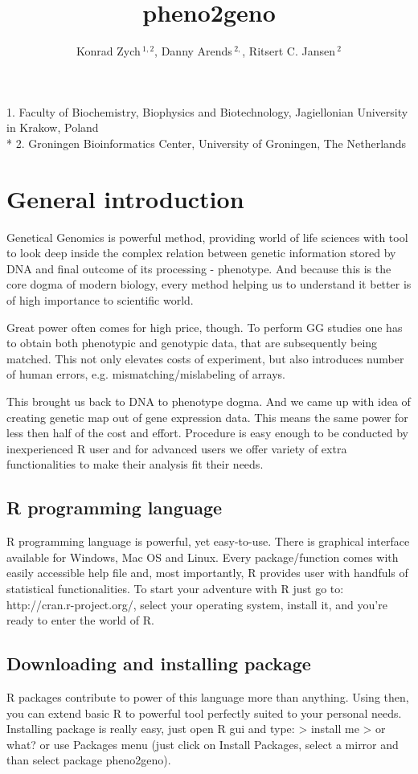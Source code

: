 \documentclass{article}
\begin{document}
\title {pheno2geno}
\author{
Konrad Zych\,$^{1,2}$, 
Danny Arends\,$^{2,}$,
 Ritsert C. Jansen\,$^{2}$
}
\maketitle
{\noindent}1. Faculty of Biochemistry, Biophysics and Biotechnology, Jagiellonian University in Krakow, Poland \\*
2. Groningen Bioinformatics Center, University of Groningen, The Netherlands

\newpage

\section{General introduction}
\begin{multicols}{2}
{\noindent}Genetical Genomics \citep{Jansen:2001388} is powerful method, providing world of life sciences with tool to look deep inside the complex relation between genetic information stored by DNA and final outcome of its processing - phenotype. And because this is the core dogma of modern biology, every method helping us to understand it better is of high importance to scientific world. 

{\noindent}Great power often comes for high price, though. To perform GG studies one has to obtain both phenotypic and genotypic data, that are subsequently being matched. This not only elevates costs of experiment, but also introduces number of human errors, e.g. mismatching/mislabeling of arrays.

{\noindent}This brought us back to DNA to phenotype dogma. And we came up with idea of creating genetic map out of gene expression data. This means the same power for less then half of the cost and effort. Procedure is easy enough to be conducted by inexperienced R user and for advanced users we offer variety of extra functionalities to make their analysis fit their needs.
\subsection{R programming language}
R programming language is powerful, yet easy-to-use. There is graphical interface available for Windows, Mac OS and Linux. Every package/function comes with easily accessible help file and, most importantly, R provides user with handfuls of statistical functionalities. To start your adventure with R just go to: http://cran.r-project.org/, select your operating system, install it, and you're ready to enter the world of R.
\subsection{Downloading and installing package}
R packages contribute to power of this language more than anything. Using then, you can extend basic R to powerful tool perfectly suited to your personal needs. Installing package is really easy, just open R gui and type:
> install me
> or what?
or use Packages menu (just click on Install Packages, select a mirror and than select package pheno2geno).
\end{multicols}
\end{document}
